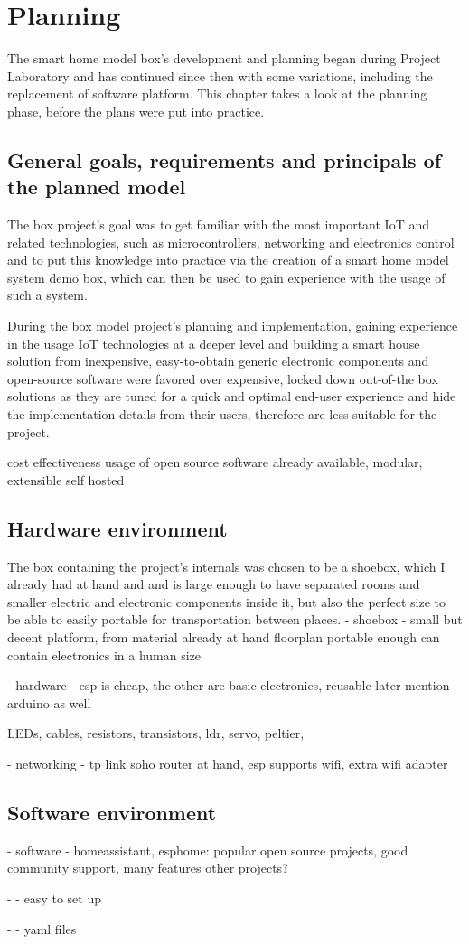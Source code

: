 \chapter{Planning}
The smart home model box's development and planning began during Project Laboratory and has continued since then with some variations, including the replacement of software platform. This chapter takes a look at the planning phase, before the plans were put into practice.

\section{General goals, requirements and principals of the planned model}
The box project's goal was to get familiar with the most important IoT and related technologies, such as microcontrollers, networking and electronics control and to put this knowledge into practice via the creation of a smart home model system demo box, which can then be used to gain experience with the usage of such a system. 



During the box model project's planning and implementation, gaining experience in the usage IoT technologies at a deeper level and building a smart house solution from inexpensive, easy-to-obtain generic electronic components and open-source software were favored over expensive, locked down out-of-the box solutions as they are tuned for a quick and optimal end-user experience and hide the implementation details from their users, therefore are less suitable for the project.

cost effectiveness
usage of open source software already available, modular, extensible
self hosted

\section{Hardware environment}
The box containing the project's internals was chosen to be a shoebox, which I already had at hand and and is large enough to have separated rooms and smaller electric and electronic components inside it, but also the perfect size to be able to easily portable for transportation between places.
- shoebox - small but decent platform, from material already at hand
floorplan
portable enough
can contain electronics in a human size

- hardware - esp is cheap, the other are basic electronics, reusable later
mention arduino as well

LEDs, cables, resistors, transistors, ldr, servo, peltier, 

- networking - tp link soho router at hand, esp supports wifi, extra wifi adapter
\section{Software environment}
- software - homeassistant, esphome: popular open source projects, good community support, many features
other projects?

- - easy to set up

- - yaml files
